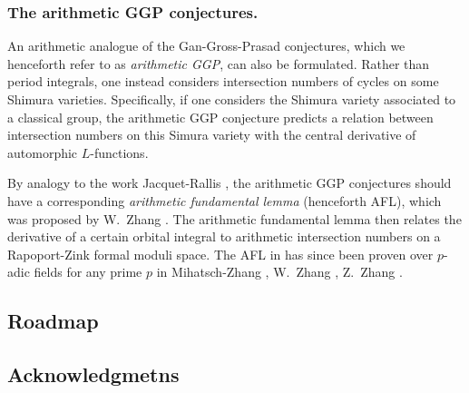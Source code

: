 \subsubsection{The arithmetic GGP conjectures.}
An arithmetic analogue of the Gan-Gross-Prasad conjectures,
which we henceforth refer to as \emph{arithmetic GGP}, can also be formulated.
Rather than period integrals,
one instead considers intersection numbers of cycles on some Shimura varieties.
Specifically, if one considers the Shimura variety associated to a classical group,
the arithmetic GGP conjecture predicts a relation between intersection numbers
on this Simura variety with the central derivative of automorphic $L$-functions.

By analogy to the work Jacquet-Rallis \cite{ref:JR},
the arithmetic GGP conjectures should have a corresponding
\emph{arithmetic fundamental lemma} (henceforth AFL),
which was proposed by W.\ Zhang \cite{ref:AFL}.
The arithmetic fundamental lemma then relates the derivative of a certain orbital integral
to arithmetic intersection numbers on a Rapoport-Zink formal moduli space.
The AFL in \cite{ref:AFL} has since been proven over $p$-adic fields for any prime $p$ in
Mihatsch-Zhang \cite{ref:MZ2021}, W.\ Zhang \cite{ref:Wei2021}, Z.\ Zhang \cite{ref:Zhiyu}.


\subsection{Roadmap}

\subsection{Acknowledgmetns}

